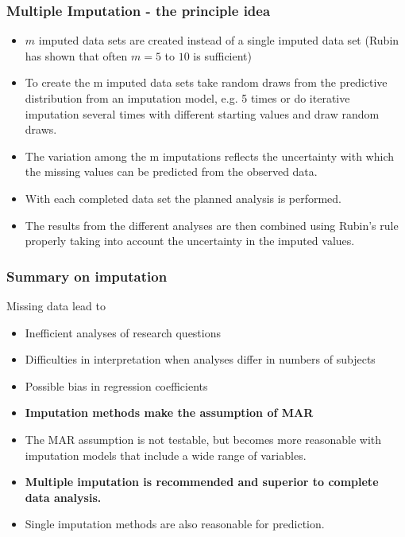 \documentclass{beamer}\usepackage[]{graphicx}\usepackage[]{color}
\begin{document}
\usebackgroundtemplate{}
\begin{frame}
\frametitle{Multiple Imputation - the principle idea}
\begin{itemize}
\item $m$ imputed data sets are created instead of a single imputed data set
(Rubin has shown that often $m = 5$ to $10$ is sufficient)
\item To create the m imputed data sets take random draws from the predictive
distribution from an imputation model, e.g. 5 times or do iterative imputation
several times with different starting values and draw random draws.
\item The variation among the m imputations reflects the uncertainty with which the
missing values can be predicted from the observed data.
\item With each completed data set the planned analysis is performed.
\item The results from the different analyses are then combined using Rubin's rule properly taking into account the uncertainty in the imputed values.
\end{itemize}
\end{frame}

\usebackgroundtemplate{}
\begin{frame}
\frametitle{Summary on imputation}
Missing data lead to
\begin{itemize}
\item Inefficient analyses of research questions
\item Difficulties in interpretation when analyses differ in numbers of subjects
\item Possible bias in regression coefficients
\end{itemize}
\begin{itemize}
\item \textbf{Imputation methods make the assumption of MAR}
\item The MAR assumption is not testable, but becomes more reasonable with
imputation models that include a wide range of variables.
\end{itemize}
\begin{itemize}
\item \textbf{Multiple imputation is recommended and superior to complete data analysis.}
\item Single imputation methods are also reasonable for prediction.
\end{itemize}
\end{frame}
\end{document}
